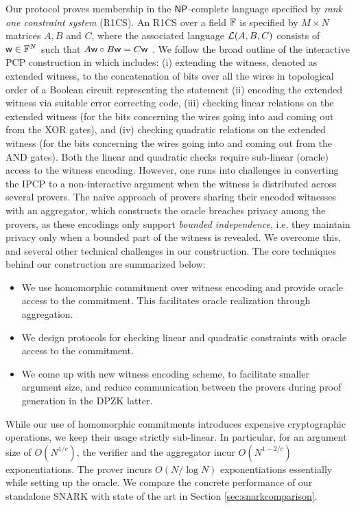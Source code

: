Our protocol proves membership in the $\mathsf{NP}$-complete
language specified by {\em rank one constraint system} (R1CS). An R1CS over a
field $\mathbb{F}$ is specified by $M\times N$ matrices $A,B$ and $C$, where the
associated language $\mathcal{L}(A,B,C)$ consists of $\mathsf{w}\in \mathbb{F}^N$ such that
$A\mathsf{w}\circ B\mathsf{w}=C\mathsf{w}$ . We follow the broad outline of the interactive PCP
construction in \cite{ligero} which includes: (i) extending the witness, denoted as extended witness, to the concatenation of bits over all the wires in topological order of a Boolean circuit representing the statement   (ii) encoding the extended witness via suitable
error correcting code, (iii) checking linear relations on the extended witness (for the bits concerning the wires going into and coming out from the XOR gates), and 
(iv) checking quadratic relations on
the extended witness  (for the bits concerning the wires going into and coming out from the AND gates). Both the linear and quadratic checks require sub-linear (oracle) access to the 
witness encoding.
However, one runs into 
challenges in converting the IPCP to a non-interactive
argument when the witness is distributed across several provers. The naive
approach of provers sharing their encoded witnesses with an aggregator, which
constructs the oracle breaches privacy among the provers, as these encodings
only support {\em bounded independence}, i.e, they maintain privacy only when a
bounded part of the witness is revealed. We overcome this, and several other
technical challenges in our construction. The core techniques behind our
construction are summarized below:
\begin{itemize}
\item We use homomorphic commitment over witness encoding and provide oracle
access to the commitment. This facilitates oracle realization through
aggregation.
\item We design protocols for checking linear and quadratic constraints
with oracle access to the commitment.
\item We come up with new witness encoding scheme, to facilitate smaller
argument size, and reduce communication between the provers during proof
generation in the DPZK latter.
\end{itemize}
While our use of homomorphic commitments introduces expensive cryptographic
operations, we keep their usage strictly sub-linear. In particular, for an
argument size of $O(N^{1/c})$, the verifier and  the aggregator incur $O(N^{1-2/c})$
exponentiations. The prover incurs $O(N/\log N)$ exponentiations essentially while
setting up the oracle. We compare the concrete performance of our standalone SNARK with state of the art in Section
\ref{sec:snarkcomparison}.
